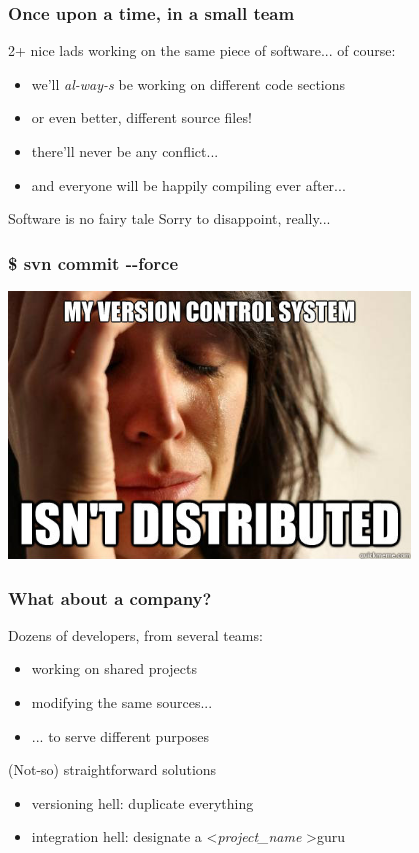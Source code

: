 \documentclass{beamer}
\begin{document}
\begin{frame}
  \frametitle{Once upon a time, in a small team}

  2+ nice lads working on the same piece of software... of course:
  \pause
  \begin{itemize}[<+->]
    \item we'll \textit{al-way-s} be working on different code sections
    \item or even better, different source files!
    \item there'll never be any conflict...
    \item and everyone will be happily compiling ever after...
  \end{itemize}
  \pause
  \begin{block}{Software is no fairy tale}
    Sorry to disappoint, really...
  \end{block}
\end{frame}

\begin{frame}
  \frametitle{\$ svn commit -{}-force}
  \begin{center}
    \includegraphics[width=0.8\textwidth]{img/notdistributed.jpg}
  \end{center}
\end{frame}

\begin{frame}
  \frametitle{What about a company?}

  Dozens of developers, from several teams:
  \pause
  \begin{itemize}[<+->]
    \item working on shared projects
    \item modifying the same sources...
    \item ... to serve different purposes
  \end{itemize}
  \pause
  \begin{block}{(Not-so) straightforward solutions}
    \begin{itemize}
      \item versioning hell: duplicate everything
      \item integration hell: designate a \textless \textit{project\_name} \textgreater guru
    \end{itemize}
  \end{block}
\end{frame}
\end{document}
